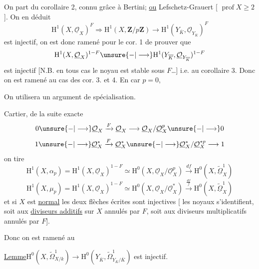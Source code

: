 On part du corollaire 2, connu grâce à Bertini; \uline{ou} Lefschetz-Grauert [  $\operatorname{prof}X\geq2$]. On en déduit
\[
\mathrm{H}^1(X,\underline{\mathcal{O}}_X)^F\Rightarrow\mathrm{H}^1(X,\mathbf{Z}/p\mathbf{Z})\longrightarrow\mathrm{H}^1(Y_{\overline{K}},\underline{\mathcal{O}}_{Y_{\overline{K}}})^F
\]
est injectif, on est donc ramené pour le cor. 1 de prouver que
\[
\mathrm{H}^1(X,\underline{\mathcal{O}}_X)^{1-F}\unsure{{-}|\longrightarrow}\mathrm{H}^1(Y_{\overline{K}},\underline{\mathcal{O}}_{Y_{\overline{K}}})^{1-F}
\]
est injectif [N.B. en tous cas le noyau est stable sous $F$\ldots] i.e. au corollaire 3. Donc on est ramené   au cas des cor. 3. et 4. En car $p=0$,


On utilisera un argument de spécialisation.

   Cartier, de la suite exacte
\[
0\unsure{{-}|\longrightarrow}\underline{\mathcal{O}}_X\xrightarrow{F}\underline{\mathcal{O}}_X\longrightarrow\underline{\mathcal{O}}_X/\underline{\mathcal{O}}_X^p\unsure{{-}|\longrightarrow}0
\]
\[
1\unsure{{-}|\longrightarrow}\underline{\mathcal{O}}_X^*\xrightarrow{F}\underline{\mathcal{O}}_X^*\unsure{{-}|\longrightarrow}\underline{\mathcal{O}}_X^*/\underline{\mathcal{O}}_X^{*p}\longrightarrow1
\]
 on tire
\[
\mathrm{H}^1(X,\alpha_p)=\mathrm{H}^1(X,\underline{\mathcal{O}}_X)^{1-F}\simeq\mathrm{H}^0(X,\underline{\mathcal{O}}_X/\underline{\mathcal{O}}_X^p)\xrightarrow{df}\mathrm{H}^0(X,\underline{\widetilde{\Omega}}^1_X)
\]
\[
\mathrm{H}^1(X,\mu_p)=\mathrm{H}^1(X,\underline{\mathcal{O}}_X)^{1-F}\simeq\mathrm{H}^0(X,\underline{\mathcal{O}}_X/\underline{\mathcal{O}}_X^*)\xrightarrow{\frac{df}{f}}\mathrm{H}^0(X,\underline{\widetilde{\Omega}}^1_X)
\]
et si $X$ est \uline{normal} les deux flèches écrites sont injectives [ les noyaux s'identifient, soit aux \uline{diviseurs additifs} sur $X$ annulés par $F$, soit aux diviseurs multiplicatifs annulés par $F$].

Donc on est ramené au

\uline{Lemme}\quad $\mathrm{H}^0(X,\widetilde{\Omega}^1_{X/k})\longrightarrow\mathrm{H}^0(Y_{\overline{K}},\widetilde{\Omega}^1_{Y_{\overline{K}}/\overline{K}})$ est injectif.

